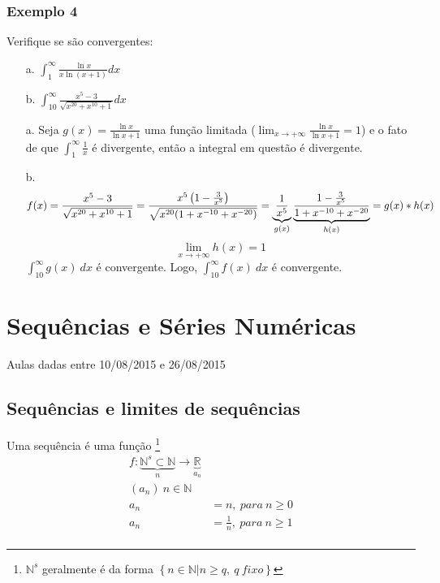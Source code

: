 \documentclass[12pt,openany]{book}
\begin{document}
\subsection{Exemplo 4}
\label{sub:ex144}

\hspace{5mm} Verifique se são convergentes:
\begin{enumerate}
\item [a.] $\displaystyle{\int_1^{\infty} \frac{\ln x}{x \ln \left(x+1\right)} dx}$
\item [b.] $\displaystyle{\int_{10}^{\infty}\frac{x^5-3}{\sqrt{x^{20}+x^{10}+1}} dx}$
\end{enumerate}

\begin{enumerate}
\item [a.] Seja  $\displaystyle{g(x) = \frac{\ln x}{\ln {x+1}}}$ uma função limitada ($\displaystyle{\lim_{x \rightarrow +\infty} \frac{\ln x}{\ln {x+1}} = 1}$) e o fato de que $\displaystyle{\int_1^{\infty} \frac{1}{x}}$ é divergente, então a integral em questão é divergente.
\item [b.] $$f(x) = \frac{x^5-3}{\sqrt{x^{20}+x^{10}+1}} = \frac{x^5\left(1-\frac{3}{x^5}\right)}{\sqrt{x^{20}(1+x^{-10}+x^{-20})}}= \underbrace{1 \over x^5}_{g(x)} \underbrace{\frac{1-\frac{3}{x^5}}{1+x^{-10}+x^{-20}}}_{h(x)} = g(x)*h(x)$$ 
$$\lim_{x \rightarrow +\infty} h(x) = 1$$ 
$\displaystyle{\int_{10}^{\infty} g(x)\ dx}$ é convergente. Logo, $\displaystyle{\int_{10}^{\infty} f(x)\ dx}$ é convergente.
\end{enumerate}

\chapter{Sequências e Séries Numéricas} Aulas dadas entre 10/08/2015 e 26/08/2015
\label{chap:c2}

\section{Sequências e limites de sequências}
\label{sec:s21}

\hspace{5mm} Uma sequência  é uma função \footnote{$\mathds{N}^s$ geralmente é da forma $\left\{ n \in \mathds{N} | n \geq q , \ q \ fixo \right\} $ } \begin{align*}
f: \underbrace{\mathds{N}^s \subset \mathds{N}}_n \rightarrow \underbrace{\mathds{R}}_{a_n} \\
(a_n) \ n \in \mathds{N} \\
a_n &= n,\ para \ n \geq 0 \\
a_n &= \frac{1}{n} ,\ para \ n \geq 1 \\
\end{align*}
\end{document}
